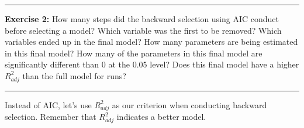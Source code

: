 \documentclass[]{book}
\newenvironment{Shaded}{\begin{snugshade}}{\end{snugshade}}
\newcommand{\KeywordTok}[1]{\textcolor[rgb]{0.13,0.29,0.53}{\textbf{{#1}}}}
\newcommand{\StringTok}[1]{\textcolor[rgb]{0.31,0.60,0.02}{{#1}}}
\newcommand{\NormalTok}[1]{{#1}}
\theoremstyle{definition}
\theoremstyle{definition}
\theoremstyle{definition}
\theoremstyle{remark}
\begin{document}
\begin{center}\rule{0.5\linewidth}{\linethickness}\end{center}

\textbf{Exercise 2:} How many steps did the backward selection using AIC
conduct before selecting a model? Which variable was the first to be
removed? Which variables ended up in the final model? How many
parameters are being estimated in this final model? How many of the
parameters in this final model are significantly different than 0 at the
0.05 level? Does this final model have a higher \(R^2_{adj}\) than the
full model for runs?

\begin{center}\rule{0.5\linewidth}{\linethickness}\end{center}

Instead of AIC, let's use \(R^2_{adj}\) as our criterion when conducting
backward selection. Remember that \(R^2_{adj}\) indicates a better
model.

\begin{Shaded}
\end{Shaded}
\end{document}
